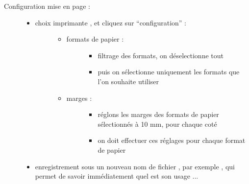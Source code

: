 \documentclass[a4paper,12pt,french]{sphinxmanual}
\begin{document}
\begin{description}
\item[{Configuration mise en page :}] \leavevmode\begin{itemize}
\item {} \begin{description}
\item[{choix imprimante , et cliquez sur ``configuration'' :}] \leavevmode\begin{itemize}
\item {} \begin{description}
\item[{formats de papier :}] \leavevmode\begin{itemize}
\item {} 
filtrage des formats, on déselectionne tout

\item {} 
puis on sélectionne uniquement les formats que l'on souhaite utiliser

\end{itemize}

\end{description}

\item {} \begin{description}
\item[{marges :}] \leavevmode\begin{itemize}
\item {} 
réglons les marges des formats de papier sélectionnés à 10 mm, pour chaque coté

\item {} 
on doit effectuer ces réglages pour chaque format de papier

\end{itemize}

\end{description}

\end{itemize}

\end{description}

\item {} 
enregistrement sous un nouveau nom de fichier , par exemple , qui permet de savoir immédiatement quel est son usage ...

\end{itemize}

\end{description}
\end{document}
